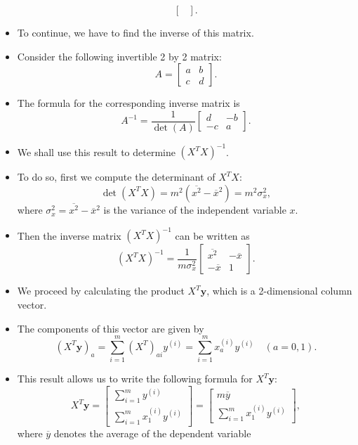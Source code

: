 \documentclass[10pt,american]{scrartcl}
\begin{document}
\begin{itemize}
\[\begin{bmatrix}
\end{bmatrix}.
\]
\item To continue, we have to find the inverse of this matrix.
\item Consider the following invertible 2 by 2 matrix:
\[
A=\begin{bmatrix}a & b\\
c & d
\end{bmatrix}.
\]
\item The formula for the corresponding inverse matrix is
\[
A^{-1}=\frac{1}{\det\left(A\right)}\begin{bmatrix}d & -b\\
-c & a
\end{bmatrix}.
\]
\item We shall use this result to determine $\left(X^{T}X\right)^{-1}$.
\item To do so, first we compute the determinant of $X^{T}X$:
\[
\det\left(X^{T}X\right)=m^{2}\left(\overline{x^{2}}-\overline{x}^{2}\right)=m^{2}\sigma_{x}^{2},
\]
where $\sigma_{x}^{2}=\overline{x^{2}}-\overline{x}^{2}$ is the variance
of the independent variable $x$.
\item Then the inverse matrix $\left(X^{T}X\right)^{-1}$ can be written
as
\[
\left(X^{T}X\right)^{-1}=\frac{1}{m\sigma_{x}^{2}}\begin{bmatrix}\overline{x^{2}} & -\overline{x}\\
-\overline{x} & 1
\end{bmatrix}.
\]
\item We proceed by calculating the product $X^{T}\mathbf{y}$, which is
a 2-dimensional column vector.
\item The components of this vector are given by
\[
\left(X^{T}\mathbf{y}\right)_{a}=\sum_{i=1}^{m}\left(X^{T}\right)_{ai}y^{\left(i\right)}=\sum_{i=1}^{m}x_{a}^{\left(i\right)}y^{\left(i\right)}\quad\left(a=0,1\right).
\]
\item This result allows us to write the following formula for $X^{T}\mathbf{y}$:
\[
X^{T}\mathbf{y}=\begin{bmatrix}\sum_{i=1}^{m}y^{\left(i\right)}\\
\sum_{i=1}^{m}x_{1}^{\left(i\right)}y^{\left(i\right)}
\end{bmatrix}=\begin{bmatrix}m\overline{y}\\
\sum_{i=1}^{m}x_{1}^{\left(i\right)}y^{\left(i\right)}
\end{bmatrix},
\]
where $\overline{y}$ denotes the average of the dependent variable

\end{itemize}
\end{document}
